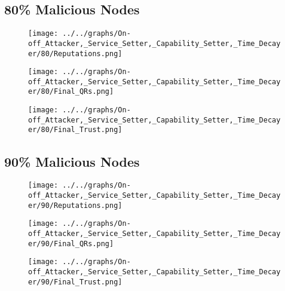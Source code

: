 \begin{minipage}[t]{0.49\columnwidth}
\subsection*{80\% Malicious Nodes}
    \begin{figure}[H]
        \centering
        \texttt{[image: ../../graphs/On-off\_Attacker,\_Service\_Setter,\_Capability\_Setter,\_Time\_Decayer/80/Reputations.png]}
    \end{figure}
    \begin{figure}[H]
        \centering
        \texttt{[image: ../../graphs/On-off\_Attacker,\_Service\_Setter,\_Capability\_Setter,\_Time\_Decayer/80/Final\_QRs.png]}
    \end{figure}
\end{minipage}
\begin{minipage}[t]{0.49\columnwidth}
    \begin{figure}[H]
        \centering
        \texttt{[image: ../../graphs/On-off\_Attacker,\_Service\_Setter,\_Capability\_Setter,\_Time\_Decayer/80/Final\_Trust.png]}
    \end{figure}
\end{minipage}

\begin{minipage}[t]{0.49\columnwidth}
\subsection*{90\% Malicious Nodes}
    \begin{figure}[H]
        \centering
        \texttt{[image: ../../graphs/On-off\_Attacker,\_Service\_Setter,\_Capability\_Setter,\_Time\_Decayer/90/Reputations.png]}
    \end{figure}
    \begin{figure}[H]
        \centering
        \texttt{[image: ../../graphs/On-off\_Attacker,\_Service\_Setter,\_Capability\_Setter,\_Time\_Decayer/90/Final\_QRs.png]}
    \end{figure}
\end{minipage}
\begin{minipage}[t]{0.49\columnwidth}
    \begin{figure}[H]
        \centering
        \texttt{[image: ../../graphs/On-off\_Attacker,\_Service\_Setter,\_Capability\_Setter,\_Time\_Decayer/90/Final\_Trust.png]}
    \end{figure}
\end{minipage}

